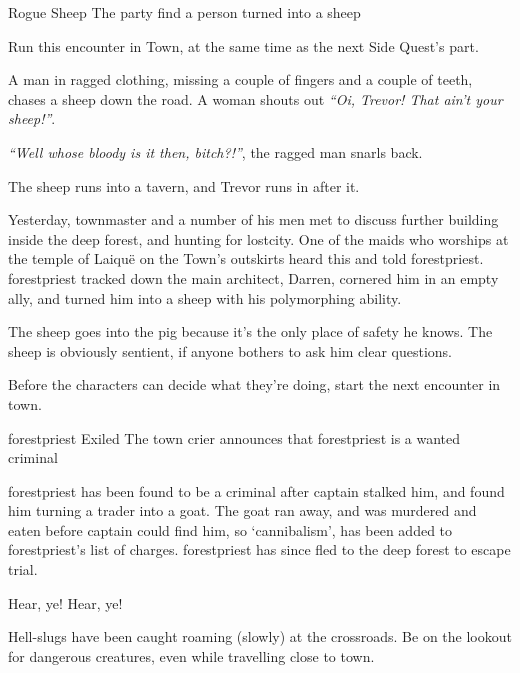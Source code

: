 \begin{multicols}{2}
{Rogue Sheep}%
{The party find a person turned into a sheep}%

Run this encounter in Town, at the same time as the next Side Quest's part.

\begin{boxtext}

  A man in ragged clothing, missing a couple of fingers and a couple of teeth, chases a sheep down the road.  A woman shouts out \emph{``Oi, Trevor! That ain't your sheep!''}.

  \emph{``Well whose bloody is it then, bitch?!''}, the ragged man snarls back.

  The sheep runs into a tavern, and Trevor runs in after it.

\end{boxtext}

Yesterday, \gls{townmaster} and a number of his men met to discuss further building inside the deep forest, and hunting for \gls{lostcity}.
One of the maids who worships at the temple of Laiqu\"{e} on the Town's outskirts heard this and told \gls{forestpriest}.
\Gls{forestpriest} tracked down the main architect, Darren, cornered him in an empty ally, and turned him into a sheep with his polymorphing ability.

The sheep goes into the \gls{pig} because it's the only place of safety he knows.  The sheep is obviously sentient, if anyone bothers to ask him clear questions.

Before the characters can decide what they're doing, start the next encounter in \gls{town}.

{\Gls{forestpriest} Exiled}%
{The town crier announces that \gls{forestpriest} is a wanted criminal}%

\Gls{forestpriest} has been found to be a criminal after \gls{captain} stalked him, and found him turning a trader into a goat.
The goat ran away, and was murdered and eaten before \gls{captain} could find him, so `cannibalism', has been added to \gls{forestpriest}'s list of charges.
\Gls{forestpriest} has since fled to the deep forest to escape trial.

\begin{speechtext}

  Hear, ye! Hear, ye!

  Hell-slugs have been caught roaming (slowly) at the crossroads.
  Be on the lookout for dangerous creatures, even while travelling close to \gls{town}.


\end{speechtext}
\end{multicols}

